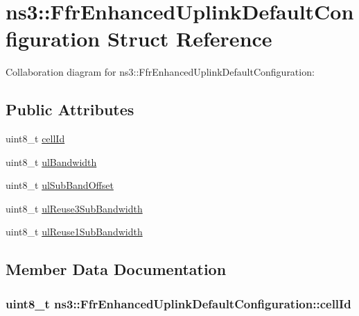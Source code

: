\hypertarget{structns3_1_1FfrEnhancedUplinkDefaultConfiguration}{}\section{ns3\+:\+:Ffr\+Enhanced\+Uplink\+Default\+Configuration Struct Reference}
\label{structns3_1_1FfrEnhancedUplinkDefaultConfiguration}


Collaboration diagram for ns3\+:\+:Ffr\+Enhanced\+Uplink\+Default\+Configuration\+:
\subsection*{Public Attributes}
\begin{DoxyCompactItemize}
\item 
uint8\+\_\+t \hyperlink{structns3_1_1FfrEnhancedUplinkDefaultConfiguration_a6efa99e210d77f7e20d883e41c4371b8}{cell\+Id}
\item 
uint8\+\_\+t \hyperlink{structns3_1_1FfrEnhancedUplinkDefaultConfiguration_afd2b978e659d89f81f34835a58393d7c}{ul\+Bandwidth}
\item 
uint8\+\_\+t \hyperlink{structns3_1_1FfrEnhancedUplinkDefaultConfiguration_ab705a1ef74cb03845e391eaed48388fa}{ul\+Sub\+Band\+Offset}
\item 
uint8\+\_\+t \hyperlink{structns3_1_1FfrEnhancedUplinkDefaultConfiguration_aa94b411eadeba61fd5be53b4670daf13}{ul\+Reuse3\+Sub\+Bandwidth}
\item 
uint8\+\_\+t \hyperlink{structns3_1_1FfrEnhancedUplinkDefaultConfiguration_af45ae0478b98726a1edbe26ccc35ed62}{ul\+Reuse1\+Sub\+Bandwidth}
\end{DoxyCompactItemize}


\subsection{Member Data Documentation}
\subsubsection[{\texorpdfstring{cell\+Id}{cellId}}]{\setlength{\rightskip}{0pt plus 5cm}uint8\+\_\+t ns3\+::\+Ffr\+Enhanced\+Uplink\+Default\+Configuration\+::cell\+Id}\hypertarget{structns3_1_1FfrEnhancedUplinkDefaultConfiguration_a6efa99e210d77f7e20d883e41c4371b8}{}\label{structns3_1_1FfrEnhancedUplinkDefaultConfiguration_a6efa99e210d77f7e20d883e41c4371b8}
